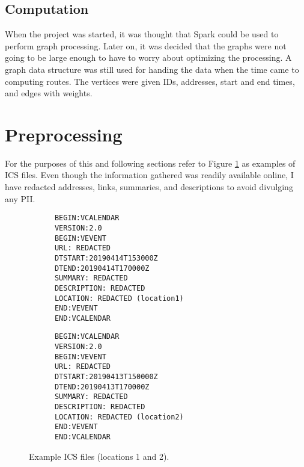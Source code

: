 \documentclass[letterpaper,11pt]{report}
\theoremstyle{definition}
\theoremstyle{definition}
\begin{document}
\subsection{Computation}

When the project was started, it was thought that Spark could be used to perform graph processing\cite{SPARK}. Later on, it was decided that the graphs were not going to be large enough to have to worry about optimizing the processing. A graph data structure was still used for handing the data when the time came to computing routes\cite{Agarwal}. The vertices were given IDs, addresses, start and end times, and edges with weights.

\section{Preprocessing}\label{preprocessing}
For the purposes of this and following sections refer to Figure \ref{ICS-Examples} as examples of ICS files. Even though the information gathered was readily available online, I have redacted addresses, links, summaries, and descriptions to avoid divulging any PII.
\begin{figure}[!htb]
  \begin{center}
    \begin{lstlisting}
      BEGIN:VCALENDAR
      VERSION:2.0
      BEGIN:VEVENT
      URL: REDACTED
      DTSTART:20190414T153000Z
      DTEND:20190414T170000Z
      SUMMARY: REDACTED
      DESCRIPTION: REDACTED
      LOCATION: REDACTED (location1)
      END:VEVENT
      END:VCALENDAR
    \end{lstlisting}
    \begin{lstlisting}
      BEGIN:VCALENDAR
      VERSION:2.0
      BEGIN:VEVENT
      URL: REDACTED
      DTSTART:20190413T150000Z
      DTEND:20190413T170000Z
      SUMMARY: REDACTED
      DESCRIPTION: REDACTED
      LOCATION: REDACTED (location2)
      END:VEVENT
      END:VCALENDAR
    \end{lstlisting}
    \caption{Example ICS files (locations 1 and 2).}\label{ICS-Examples}
    \end{center}
  \end{figure}
\end{document}

